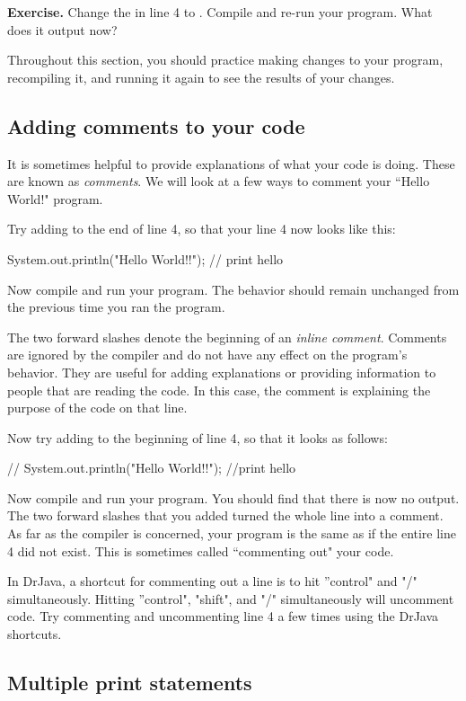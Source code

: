 \textbf{Exercise.} Change the  in line 4 to . Compile and re-run your program. What does it output now?

Throughout this section, you should practice making changes to your program, recompiling it, and running it again to see the results of your changes.

\subsection{Adding comments to your code}

It is sometimes helpful to provide explanations of what your code is doing. These are known as \emph{comments}. We will look at a few ways to comment your ``Hello World!" program.

Try adding  to the end of line 4, so that your line 4 now looks like this:
\begin{code}
        System.out.println("Hello World!!"); // print hello
\end{code}

Now compile and run your program. The behavior should remain unchanged from the previous time you ran the program.

The two forward slashes \ic{//} denote the beginning of an \emph{inline comment}. Comments are ignored by the compiler and do not have any effect on the program's behavior. They are useful for adding explanations or providing information to people that are reading the code. In this case, the comment  is explaining the purpose of the code on that line.

Now try adding \ic{//} to the beginning of line 4, so that it looks as follows:
\begin{code}
//        System.out.println("Hello World!!"); //print hello
\end{code}
Now compile and run your program. You should find that there is now no output. The two forward slashes that you added turned the whole line into a comment. As far as the compiler is concerned, your program is the same as if the entire line 4 did not exist. This is sometimes called ``commenting out" your code. 

In DrJava, a shortcut for commenting out a line is to hit ''control" and "/" simultaneously. Hitting ''control", "shift", and "/" simultaneously will uncomment code. Try commenting and uncommenting line 4 a few times using the DrJava shortcuts. 

\subsection{Multiple print statements}

